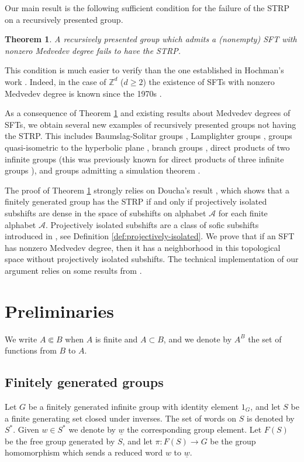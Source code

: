 \documentclass[a4paper,oneside]{amsart}
\renewcommand{\(}{\begin{dmath*}}
\renewcommand{\)}{\end{dmath*}}
\newtheorem{theorem}{Theorem}[section]
\theoremstyle{definition}
\newcommand{\A}{\mathcal{A}}
\begin{document}
Our main result is the following sufficient condition for the failure of the STRP on a recursively presented group. 
\begin{theorem}\label{main}
    A recursively presented group which admits a (nonempty) SFT with nonzero Medvedev degree  fails to have the STRP.
\end{theorem}
This condition is much easier to verify than the one established in Hochman's work \cite{hochman_rohlin_2012}. Indeed, in the case of $\mathbb{Z}^d$ ($d\geq 2$) the existence of SFTs with nonzero Medvedev degree is known since the 1970s \cite{hanf_nonrecursive_1974,myers_nonrecursive_1974}. 


As a consequence of Theorem \ref{main} and existing results about Medvedev degrees of SFTs, we obtain several new examples of recursively presented groups not having the STRP. This includes Baumslag-Solitar groups \cite{aubrun_tiling_2013}, Lamplighter groups \cite{bartholdi_shifts_2024}, groups quasi-isometric to the hyperbolic plane \cite{barbieri_medvedev_2024}, branch groups \cite{barbieri_medvedev_2024}, direct products of two infinite groups \cite[Theorem 5.8]{barbieri_medvedev_2024} (this was previously known for direct products of three infinite groups \cite[Theorem C]{doucha_strong_2024}), and groups admitting a simulation theorem  \cite[\S 5.5]{barbieri_medvedev_2024}. 



The proof of Theorem \ref{main} strongly relies on Doucha's result   \cite[Theorem A]{doucha_strong_2024}, which shows that a  finitely generated group has the STRP if and only if projectively isolated subshifts are dense in the space of subshifts on alphabet $\A$ for each finite alphabet $\A$. Projectively isolated subshifts are a class of sofic subshifts introduced in \cite{doucha_strong_2024}, see Definition \ref{def:projectively-isolated}. We prove that if an SFT has nonzero Medvedev degree, then it has a neighborhood in this topological space without projectively isolated subshifts. The technical implementation of our argument  relies on some results from \cite{barbieri_effective_2025}. 
\section{Preliminaries}
We write $A\Subset B$ when $A$ is finite and $A\subset B$, and we denote by $A^B$ the set of functions from $B$ to $A$. 
\subsection{Finitely generated groups}
Let $G$ be a finitely generated infinite group with identity element $1_G$, and let $S$ be a finite generating set closed under inverses. The set of words on $S$ is denoted by $S^\ast$. Given $w\in S^\ast$ we denote by $\underline{w}$ the corresponding group element. Let $F(S)$ be the free group generated by $S$, and let $\pi\colon F(S)\to G$ be the group homomorphism which sends a reduced word $w$ to $\underline w$. 
\end{document}
